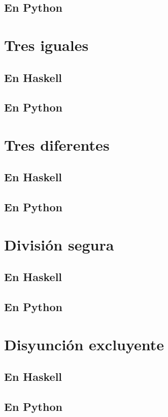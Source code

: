 \documentclass[a4paper,12pt,twoside]{book}
\begin{document}
\subsection*{En Python}

\section{Tres iguales}
\subsection*{En Haskell}
\subsection*{En Python}

\section{Tres diferentes}
\subsection*{En Haskell}
\subsection*{En Python}

\section{División segura}
\subsection*{En Haskell}
\subsection*{En Python}

\section{Disyunción excluyente}
\subsection*{En Haskell}
\subsection*{En Python}
\end{document}
